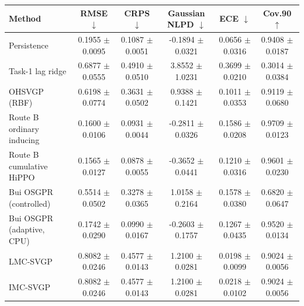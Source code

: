 \begin{tabular}{lccccc}
\toprule
Method & RMSE $\downarrow$ & CRPS $\downarrow$ & Gaussian NLPD $\downarrow$ & ECE $\downarrow$ & Cov.90 $\uparrow$ \\
\midrule
Persistence & 0.1955 $\pm$ 0.0095 & 0.1087 $\pm$ 0.0051 & -0.1894 $\pm$ 0.0321 & 0.0656 $\pm$ 0.0316 & 0.9408 $\pm$ 0.0187 \\
Task-1 lag ridge & 0.6877 $\pm$ 0.0555 & 0.4910 $\pm$ 0.0510 & 3.8552 $\pm$ 1.0231 & 0.3699 $\pm$ 0.0210 & 0.3014 $\pm$ 0.0384 \\
OHSVGP (RBF) & 0.6198 $\pm$ 0.0774 & 0.3631 $\pm$ 0.0502 & 0.9388 $\pm$ 0.1421 & 0.1011 $\pm$ 0.0353 & 0.9119 $\pm$ 0.0680 \\
Route B ordinary inducing & 0.1600 $\pm$ 0.0106 & 0.0931 $\pm$ 0.0044 & -0.2811 $\pm$ 0.0326 & 0.1586 $\pm$ 0.0208 & 0.9709 $\pm$ 0.0123 \\
Route B cumulative HiPPO & 0.1565 $\pm$ 0.0127 & 0.0878 $\pm$ 0.0055 & -0.3652 $\pm$ 0.0441 & 0.1210 $\pm$ 0.0316 & 0.9601 $\pm$ 0.0230 \\
Bui OSGPR (controlled) & 0.5514 $\pm$ 0.0502 & 0.3278 $\pm$ 0.0365 & 1.0158 $\pm$ 0.2164 & 0.1578 $\pm$ 0.0380 & 0.6820 $\pm$ 0.0647 \\
Bui OSGPR (adaptive, CPU) & 0.1742 $\pm$ 0.0290 & 0.0990 $\pm$ 0.0167 & -0.2603 $\pm$ 0.1757 & 0.1267 $\pm$ 0.0435 & 0.9520 $\pm$ 0.0134 \\
LMC-SVGP & 0.8082 $\pm$ 0.0246 & 0.4577 $\pm$ 0.0143 & 1.2100 $\pm$ 0.0281 & 0.0198 $\pm$ 0.0099 & 0.9024 $\pm$ 0.0056 \\
IMC-SVGP & 0.8082 $\pm$ 0.0246 & 0.4577 $\pm$ 0.0143 & 1.2100 $\pm$ 0.0281 & 0.0218 $\pm$ 0.0102 & 0.9024 $\pm$ 0.0056 \\
\bottomrule
\end{tabular}
